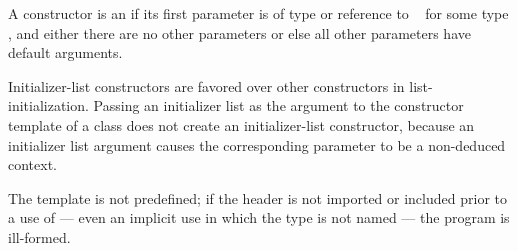 \pnum
A constructor is an  if its first parameter is
of type  or reference to
\cv{}~ for some type , and either there are no other
parameters or else all other parameters have default arguments.
\begin{note}
Initializer-list constructors are favored over other constructors in
list-initialization. Passing an initializer list as the argument
to the constructor template  of a class  does not
create an initializer-list constructor, because an initializer list argument causes the
corresponding parameter to be a non-deduced context.
\end{note}
The template
 is not predefined; if the header
 is not imported or included prior to a use of
 --- even an implicit use in which the type is not
named --- the program is ill-formed.

